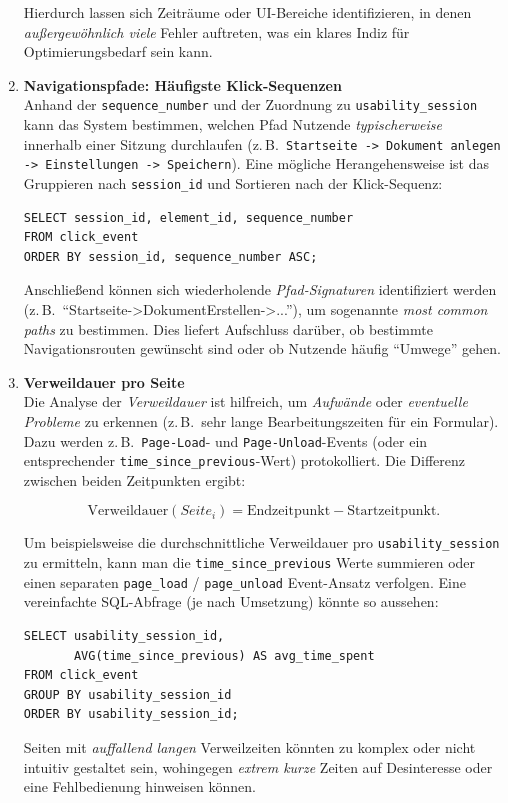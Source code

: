 \documentclass[12pt,oneside]{article}
\begin{document}
\begin{enumerate}
    Hierdurch lassen sich Zeiträume oder UI-Bereiche identifizieren, in denen \emph{außergewöhnlich viele} Fehler auftreten, was ein klares Indiz für Optimierungsbedarf sein kann.

    \item \textbf{Navigationspfade: Häufigste Klick-Sequenzen}\\
    Anhand der \lstinline|sequence_number| und der Zuordnung zu \lstinline|usability_session| kann das System bestimmen, welchen Pfad Nutzende \emph{typischerweise} innerhalb einer Sitzung durchlaufen (z.\,B.\ \texttt{Startseite -> Dokument anlegen -> Einstellungen -> Speichern}). Eine mögliche Herangehensweise ist das Gruppieren nach \lstinline|session_id| und Sortieren nach der Klick-Sequenz:

    \begin{lstlisting}[style=sql,caption={Beispiel: Pfadrekonstruktion je Session}]
SELECT session_id, element_id, sequence_number
FROM click_event
ORDER BY session_id, sequence_number ASC;
    \end{lstlisting}

    Anschließend können sich wiederholende \emph{Pfad-Signaturen} identifiziert werden (z.\,B.\ \enquote{Startseite->DokumentErstellen->...}), um sogenannte \emph{most common paths} zu bestimmen. Dies liefert Aufschluss darüber, ob bestimmte Navigationsrouten gewünscht sind oder ob Nutzende häufig \enquote{Umwege} gehen.

    \item \textbf{Verweildauer pro Seite}\\
    Die Analyse der \emph{Verweildauer} ist hilfreich, um \emph{Aufwände} oder \emph{eventuelle Probleme} zu erkennen (z.\,B.\ sehr lange Bearbeitungszeiten für ein Formular). Dazu werden z.\,B.\ \texttt{Page-Load}- und \texttt{Page-Unload}-Events (oder ein entsprechender \texttt{time\_since\_previous}-Wert) protokolliert. Die Differenz zwischen beiden Zeitpunkten ergibt:

    \[
    \text{Verweildauer}(Seite_i) = \text{Endzeitpunkt} - \text{Startzeitpunkt}.
    \]

    Um beispielsweise die durchschnittliche Verweildauer pro \texttt{usability\_session} zu ermitteln, kann man die \lstinline|time_since_previous| Werte summieren oder einen separaten \lstinline|page_load| / \lstinline|page_unload| Event-Ansatz verfolgen. Eine vereinfachte SQL-Abfrage (je nach Umsetzung) könnte so aussehen:

    \begin{lstlisting}[style=sql,caption={Beispiel: Durchschnittliche Verweildauer je Session}]
SELECT usability_session_id,
       AVG(time_since_previous) AS avg_time_spent
FROM click_event
GROUP BY usability_session_id
ORDER BY usability_session_id;
    \end{lstlisting}

    Seiten mit \emph{auffallend langen} Verweilzeiten könnten zu komplex oder nicht intuitiv gestaltet sein, wohingegen \emph{extrem kurze} Zeiten auf Desinteresse oder eine Fehlbedienung hinweisen können.
\end{enumerate}
\end{document}
